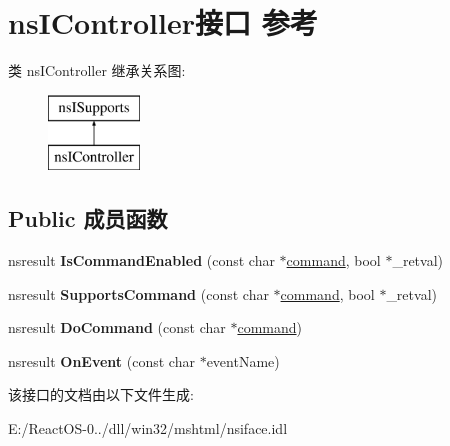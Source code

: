 \hypertarget{interfacens_i_controller}{}\section{ns\+I\+Controller接口 参考}
\label{interfacens_i_controller}
类 ns\+I\+Controller 继承关系图\+:\begin{figure}[H]
\begin{center}
\leavevmode
\includegraphics[height=2.000000cm]{interfacens_i_controller}
\end{center}
\end{figure}
\subsection*{Public 成员函数}
\begin{DoxyCompactItemize}
\item 
\mbox{\label{interfacens_i_controller_a03585015b85726f57b997896897432cf}} 
nsresult {\bfseries Is\+Command\+Enabled} (const char $\ast$\hyperlink{structcommand}{command}, bool $\ast$\+\_\+retval)
\item 
\mbox{\label{interfacens_i_controller_a09197684455e35538dd1eb41ed5c5958}} 
nsresult {\bfseries Supports\+Command} (const char $\ast$\hyperlink{structcommand}{command}, bool $\ast$\+\_\+retval)
\item 
\mbox{\label{interfacens_i_controller_a995b4a33054013c4a1527965dc84b613}} 
nsresult {\bfseries Do\+Command} (const char $\ast$\hyperlink{structcommand}{command})
\item 
\mbox{\label{interfacens_i_controller_abb120283508fcb35145da15dea8165fb}} 
nsresult {\bfseries On\+Event} (const char $\ast$event\+Name)
\end{DoxyCompactItemize}


该接口的文档由以下文件生成\+:\begin{DoxyCompactItemize}
\item 
E\+:/\+React\+O\+S-\/0../dll/win32/mshtml/nsiface.\+idl\end{DoxyCompactItemize}
